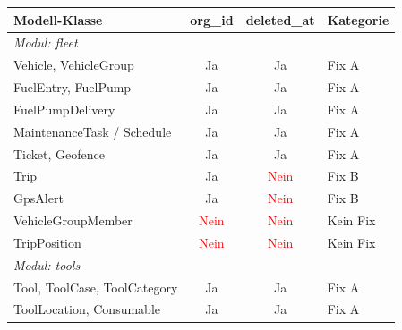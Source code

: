\begin{table}[H]
    \begin{center}
        \renewcommand{\arraystretch}{1.3}
        \begin{tabular}{|l|c|c|l|}
            \hline
            \textbf{Modell-Klasse}        & \textbf{org\_id}               & \textbf{deleted\_at}           & \textbf{Kategorie} \\
            \hline
            \multicolumn{4}{|l|}{\textit{Modul: fleet}}                                                                          \\
            \hline
            Vehicle, VehicleGroup         & \textcolor{green!60!black}{Ja} & \textcolor{green!60!black}{Ja} & Fix A              \\
            FuelEntry, FuelPump           & \textcolor{green!60!black}{Ja} & \textcolor{green!60!black}{Ja} & Fix A              \\
            FuelPumpDelivery              & \textcolor{green!60!black}{Ja} & \textcolor{green!60!black}{Ja} & Fix A              \\
            MaintenanceTask / Schedule    & \textcolor{green!60!black}{Ja} & \textcolor{green!60!black}{Ja} & Fix A              \\
            Ticket, Geofence              & \textcolor{green!60!black}{Ja} & \textcolor{green!60!black}{Ja} & Fix A              \\
            Trip                          & \textcolor{green!60!black}{Ja} & \textcolor{red}{Nein}          & Fix B              \\
            GpsAlert                      & \textcolor{green!60!black}{Ja} & \textcolor{red}{Nein}          & Fix B              \\
            VehicleGroupMember            & \textcolor{red}{Nein}          & \textcolor{red}{Nein}          & Kein Fix           \\
            TripPosition                  & \textcolor{red}{Nein}          & \textcolor{red}{Nein}          & Kein Fix           \\
            \hline
            \multicolumn{4}{|l|}{\textit{Modul: tools}}                                                                          \\
            \hline
            Tool, ToolCase, ToolCategory  & \textcolor{green!60!black}{Ja} & \textcolor{green!60!black}{Ja} & Fix A              \\
            ToolLocation, Consumable      & \textcolor{green!60!black}{Ja} & \textcolor{green!60!black}{Ja} & Fix A              \\

\end{tabular}
\end{center}
\end{table}
